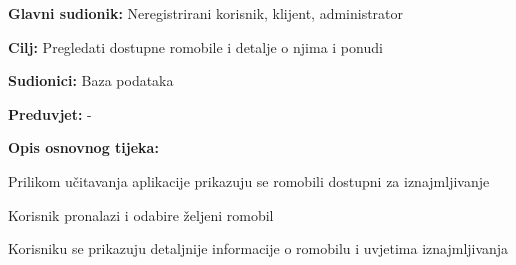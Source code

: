 					
					\noindent {}
					\begin{packed_item}
	
						\item \textbf{Glavni sudionik: }Neregistrirani korisnik, klijent, administrator 
						\item  \textbf{Cilj:} Pregledati dostupne romobile i detalje o njima i ponudi
						\item  \textbf{Sudionici:} Baza podataka
						\item  \textbf{Preduvjet:} -
						\item  \textbf{Opis osnovnog tijeka:}
						
						\item[] \begin{packed_enum}
	
							\item Prilikom učitavanja aplikacije prikazuju se romobili dostupni za iznajmljivanje
							\item Korisnik pronalazi i odabire željeni romobil
							\item Korisniku se prikazuju detaljnije informacije o romobilu i uvjetima iznajmljivanja
						
						\end{packed_enum}
					\end{packed_item}
						
